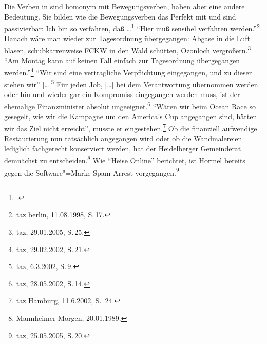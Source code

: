 \noindent
Die Verben in  sind homonym mit
Bewegungsverben, haben aber eine andere Bedeutung. Sie bilden wie die Bewegungsverben
das Perfekt mit \sein und sind passivierbar:
\eal
\ex{}
Ich bin so verfahren, daß \ldots\footnote{
        .%
}
\ex 
"`Hier muß sensibel verfahren werden."'\footnote{
        taz berlin, 11.08.1998, S.\,17.%
}
\zl
\eal
\ex Danach wäre man wieder zur Tagesordnung übergegangen: Abgase in die Luft blasen, schubkarrenweise FCKW in den Wald schütten, Ozonloch vergrößern.\footnote{
  taz, 29.01.2005, S.\,25.
}
\ex "`Am Montag kann auf keinen Fall einfach zur Tagesordnung übergegangen werden."'\footnote{
        taz, 29.02.2002, S.\,21.
}
\zl
\eal
\label{bsp-eingegangen-all}
\ex{}
"`Wir sind eine vertragliche Verpflichtung eingegangen, und zu dieser stehen wir"' [\ldots]\footnote{
        taz, 6.3.2002, S.\,9.%
}
\ex\label{bsp-eingegangen}
Für jeden Job, [\ldots] bei dem Verantwortung übernommen werden oder hin und wieder gar
    ein Kompromiss eingegangen werden muss, ist der ehemalige Finanzminister absolut ungeeignet.\footnote{
        taz, 28.05.2002, S.\,14.%
    }
%
\zl
\eal
\label{bsp-angegangen-all}
\ex{}
"`Wären wir beim Ocean Race so gesegelt, wie wir die Kampagne um den America's Cup angegangen sind, 
hätten wir das Ziel nicht erreicht"', musste er eingestehen.\footnote{
        taz Hamburg, 11.6.2002, S.\, 24.%
}
%
\ex\label{bsp-angegangen}
Ob die finanziell
aufwendige Restaurierung nun tatsächlich angegangen wird oder ob die Wandmalereien lediglich fachgerecht konserviert werden, hat der
Heidelberger Gemeinderat demnächst zu entscheiden.\footnote{
        Mannheimer Morgen, 20.01.1989.%
}
\zl
\eal
\ex Wie "`Heise Online"' berichtet, ist Hormel bereits gegen die Software"=Marke Spam Arrest vorgegangen.\footnote{
  taz, 25.05.2005, S.\,20.%
}
